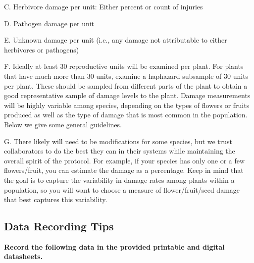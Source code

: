\documentclass[
  letterpaper,
  oneside,
  open=any]{scrbook}
\begin{document}
C. Herbivore damage per unit: Either percent or count of injuries

D. Pathogen damage per unit

E. Unknown damage per unit (i.e., any damage not attributable to either
herbivores or pathogens)

F. Ideally at least 30 reproductive units will be examined per plant.
For plants that have much more than 30 units, examine a haphazard
subsample of 30 units per plant. These should be sampled from different
parts of the plant to obtain a good representative sample of damage
levels to the plant. Damage measurements will be highly variable among
species, depending on the types of flowers or fruits produced as well as
the type of damage that is most common in the population. Below we give
some general guidelines.

G. There likely will need to be modifications for some species, but we
trust collaborators to do the best they can in their systems while
maintaining the overall spirit of the protocol. For example, if your
species has only one or a few flowers/fruit, you can estimate the damage
as a percentage. Keep in mind that the goal is to capture the
variability in damage rates among plants within a population, so you
will want to choose a measure of flower/fruit/seed damage that best
captures this variability.

\subsection{Data Recording Tips}\label{data-recording-tips}

\textbf{Record the following data in the provided printable and digital
datasheets.}
\end{document}
